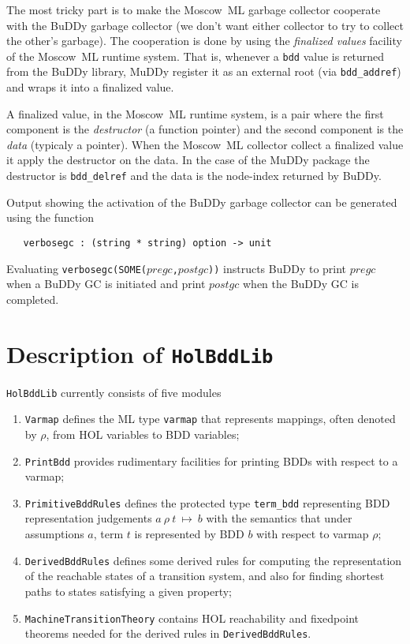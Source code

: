 \documentclass[12pt]{article}
\newcommand{\bnind}[1]{\index[MLbn]{\texttt{#1}}}
\renewcommand{\t}[1]{\mbox{\tt #1}}
\newcommand{\termbdd}[4]{\mbox{$#1~#2~#3~\mapsto~#4$}}
\newcommand\termbddty{\texttt{term\_bdd}\xspace}
\newcommand{\mosml}{Moscow~ML\xspace}
\newcommand{\Buddy}{BuDDy\xspace}
\newcommand{\Muddy}{MuDDy\xspace}
\begin{document}
The most tricky part is to make the \mosml garbage collector cooperate
with the \Buddy garbage collector (we don't want either collector to
try to collect the other's garbage).  The cooperation is done by using
the \emph{finalized values} facility of the \mosml runtime system.
That is, whenever a \texttt{bdd} value is returned from the \Buddy
library, \Muddy register it as an external root (via
\verb+bdd_addref+) and wraps it into a finalized value.  

A finalized value, in the \mosml runtime system, is a pair where the
first component is the \emph{destructor} (a function pointer) and the
second component is the \emph{data} (typicaly a pointer).  When the
\mosml collector collect a finalized value it apply the destructor on
the data.  In the case of the \Muddy package the destructor is
\verb+bdd_delref+ and the data is the node-index returned by \Buddy.

Output showing the activation of the \Buddy garbage collector can be generated
using the function

\begin{verbatim}
   verbosegc : (string * string) option -> unit
\end{verbatim}\bnind{verbosegc}

Evaluating \t{verbosegc(SOME($pregc$,$postgc$))} instructs BuDDy to print
$pregc$ when a BuDDy GC is initiated and print $postgc$ when the
\Buddy GC is completed.

\newpage

\part{Description of \t{HolBddLib}}\label{HolBddLib}

\t{HolBddLib} currently consists of five modules

\begin{enumerate}
\item \t{Varmap} defines the ML type \t{varmap} that represents mappings,
often denoted by $\rho$,
from HOL variables to BDD variables;

\item \t{PrintBdd} provides rudimentary facilities for printing
BDDs with respect to a varmap;

\item \t{PrimitiveBddRules} defines the protected type \termbddty
representing BDD representation judgements \termbdd{a}{\rho}{t}{b}
with the semantics that under assumptions $a$, term $t$ is represented by BDD $b$ with respect to
varmap $\rho$;

\item \t{DerivedBddRules} defines some derived rules for computing
the representation of the reachable states of a transition system,
and also for finding shortest paths to states  satisfying a given property;

\item \t{MachineTransitionTheory} contains HOL reachability and fixedpoint theorems needed
for the derived rules in  \t{DerivedBddRules}.


\end{enumerate}
\end{document}
